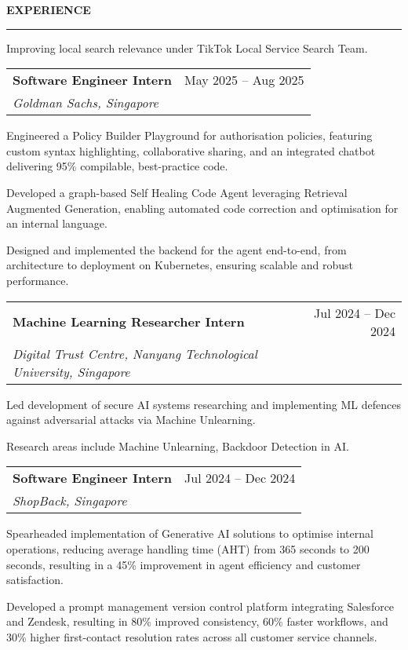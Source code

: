 \documentclass[11pt,letterpaper]{article}
\makeatletter
\newcommand{\resheading}[1]{%
  \vspace{2pt}
  {\normalsize \textbf{\MakeUppercase{#1}}}\\
  \vspace{-8pt}
  \hrule
}
\newcommand{\resitem}[1]{\item \small #1 \vspace{-2pt}}
\newcommand{\ressubheading}[4]{
    \vspace{2pt}
    \begin{tabular*}{\textwidth}{l@{\extracolsep{\fill}}r}
        \small \textbf{#1} & \small #2 \\
        \small \textit{#3} & \small \textit{#4} \\
    \end{tabular*}\vspace{-3pt}}
\makeatother
\begin{document}
\resheading{Experience}
\begin{leftitemize}
\item[]
\begin{subitemize}
    \resitem{Improving local search relevance under TikTok Local Service Search Team.}
\end{subitemize}

\item[]
\ressubheading{Software Engineer Intern}{May 2025 -- Aug 2025}{Goldman Sachs, Singapore}{}
\begin{subitemize}
    \resitem{Engineered a Policy Builder Playground for authorisation policies, featuring custom syntax highlighting, collaborative sharing, and an integrated chatbot delivering 95\% compilable, best-practice code.}
    \resitem{Developed a graph-based Self Healing Code Agent leveraging Retrieval Augmented Generation, enabling automated code correction and optimisation for an internal language.}
    \resitem{Designed and implemented the backend for the agent end-to-end, from architecture to deployment on Kubernetes, ensuring scalable and robust performance.}
\end{subitemize}

\item[]
\ressubheading{Machine Learning Researcher Intern}{Jul 2024 -- Dec 2024}{Digital Trust Centre, Nanyang Technological University, Singapore}{}
\begin{subitemize}
    \resitem{Led development of secure AI systems researching and implementing ML defences against adversarial attacks via Machine Unlearning.}
    \resitem{Research areas include Machine Unlearning, Backdoor Detection in AI.}
\end{subitemize}

\item[]
\ressubheading{Software Engineer Intern}{Jul 2024 -- Dec 2024}{ShopBack, Singapore}{}
\begin{subitemize}
    \resitem{Spearheaded implementation of Generative AI solutions to optimise internal operations, reducing average handling time (AHT) from 365 seconds to 200 seconds, resulting in a 45\% improvement in agent efficiency and customer satisfaction.}
    \resitem{Developed a prompt management version control platform integrating Salesforce and Zendesk, resulting in 80\% improved consistency, 60\% faster workflows, and 30\% higher first-contact resolution rates across all customer service channels.}
\end{subitemize}


\end{leftitemize}
\end{document}
